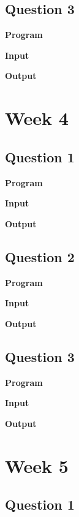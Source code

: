\documentclass{article}
\begin{document}
\newpage
\subsection{Question 3}

\newline

\noindent \textbf{\large{Program}}

\newpage
\noindent \textbf{\large{Input}}

\noindent \textbf{\large{Output}}

\newpage
\section{Week 4}

\subsection{Question 1}

\newline

\noindent \textbf{\large{Program}}

\newpage
\noindent \textbf{\large{Input}}

\noindent \textbf{\large{Output}}


\newpage
\subsection{Question 2}

\newline

\noindent \textbf{\large{Program}}

\newpage
\noindent \textbf{\large{Input}}

\noindent \textbf{\large{Output}}


\newpage
\subsection{Question 3}

\newline

\noindent \textbf{\large{Program}}

\newpage
\noindent \textbf{\large{Input}}

\noindent \textbf{\large{Output}}

\newpage
\section{Week 5}

\subsection{Question 1}

\newline
\end{document}
